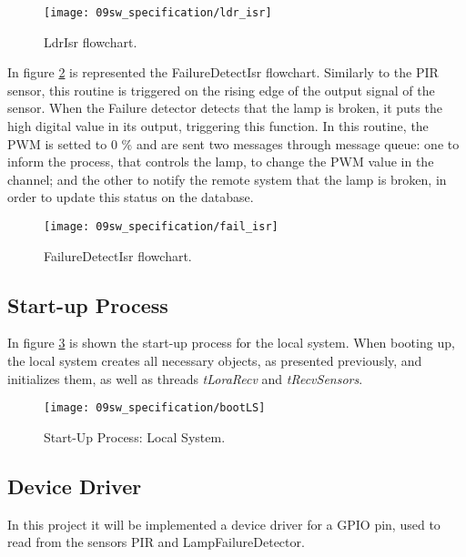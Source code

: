 \begin{figure}[H]
	\centering
	\texttt{[image: 09sw\_specification/ldr\_isr]}
	\caption{LdrIsr flowchart.}
	\label{fig:ldr_isr}
\end{figure}

In figure \ref{fig:fail_isr} is represented the FailureDetectIsr flowchart. Similarly to the PIR sensor, this routine is triggered on the rising edge of the output signal of the sensor. When the Failure detector detects that the lamp is broken, it puts the high digital value in its output, triggering this function. In this routine, the PWM is setted to 0 \% and are sent two messages through message queue: one to inform the process, that controls the lamp, to change the PWM value in the channel; and the other to notify the remote system that the lamp is broken, in order to update this status on the database.

\begin{figure}[H]
	\centering
	\texttt{[image: 09sw\_specification/fail\_isr]}
	\caption{FailureDetectIsr flowchart.}
	\label{fig:fail_isr}
\end{figure}

\subsection{Start-up Process}
In figure \ref{fig:bootLS} is shown the start-up process for the local system. When booting up, the local system creates all necessary objects, as presented previously, and initializes them, as well as threads \textit{tLoraRecv} and \textit{tRecvSensors}.

\begin{figure}[H]
	\centering
	\texttt{[image: 09sw\_specification/bootLS]}
	\caption{Start-Up Process: Local System.}
	\label{fig:bootLS}
\end{figure}


\clearpage
\subsection{Device Driver}
In this project it will be implemented a device driver for a GPIO pin, used to read from the sensors PIR and LampFailureDetector.

